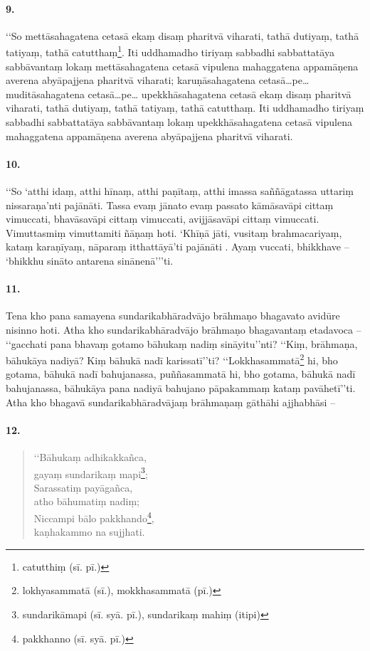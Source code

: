 \paragraph{9.} ‘‘So mettāsahagatena cetasā ekaṃ disaṃ pharitvā viharati, tathā dutiyaṃ, tathā tatiyaṃ, tathā catutthaṃ\footnote{catutthiṃ (sī. pī.)}. Iti uddhamadho tiriyaṃ sabbadhi sabbattatāya sabbāvantaṃ lokaṃ mettāsahagatena cetasā vipulena mahaggatena appamāṇena averena abyāpajjena pharitvā viharati; karuṇāsahagatena cetasā…pe… muditāsahagatena cetasā…pe… upekkhāsahagatena cetasā ekaṃ disaṃ pharitvā viharati, tathā dutiyaṃ, tathā tatiyaṃ, tathā catutthaṃ. Iti uddhamadho tiriyaṃ sabbadhi sabbattatāya sabbāvantaṃ lokaṃ upekkhāsahagatena cetasā vipulena mahaggatena appamāṇena averena abyāpajjena pharitvā viharati.

\paragraph{10.} ‘‘So ‘atthi idaṃ, atthi hīnaṃ, atthi paṇītaṃ, atthi imassa saññāgatassa uttariṃ nissaraṇa’nti pajānāti. Tassa evaṃ jānato evaṃ passato kāmāsavāpi cittaṃ vimuccati, bhavāsavāpi cittaṃ vimuccati, avijjāsavāpi cittaṃ vimuccati. Vimuttasmiṃ vimuttamiti ñāṇaṃ hoti. ‘Khīṇā jāti, vusitaṃ brahmacariyaṃ, kataṃ karaṇīyaṃ, nāparaṃ itthattāyā’ti pajānāti . Ayaṃ vuccati, bhikkhave – ‘bhikkhu sināto antarena sinānenā’’’ti.

\paragraph{11.} Tena kho pana samayena sundarikabhāradvājo brāhmaṇo bhagavato avidūre nisinno hoti. Atha kho sundarikabhāradvājo brāhmaṇo bhagavantaṃ etadavoca – ‘‘gacchati pana bhavaṃ gotamo bāhukaṃ nadiṃ sināyitu’’nti? ‘‘Kiṃ, brāhmaṇa, bāhukāya nadiyā? Kiṃ bāhukā nadī karissatī’’ti? ‘‘Lokkhasammatā\footnote{lokhyasammatā (sī.), mokkhasammatā (pī.)} hi, bho gotama, bāhukā nadī bahujanassa, puññasammatā hi, bho gotama, bāhukā nadī bahujanassa, bāhukāya pana nadiyā bahujano pāpakammaṃ kataṃ pavāhetī’’ti. Atha kho bhagavā sundarikabhāradvājaṃ brāhmaṇaṃ gāthāhi ajjhabhāsi –

\paragraph{12.}\begin{verse}
  ‘‘Bāhukaṃ adhikakkañca, \\gayaṃ sundarikaṃ mapi\footnote{sundarikāmapi (sī. syā. pī.), sundarikaṃ mahiṃ (itipi)};\\
  Sarassatiṃ payāgañca, \\atho bāhumatiṃ nadiṃ;\\
  Niccampi bālo pakkhando\footnote{pakkhanno (sī. syā. pī.)}, \\kaṇhakammo na sujjhati.
\end{verse}

